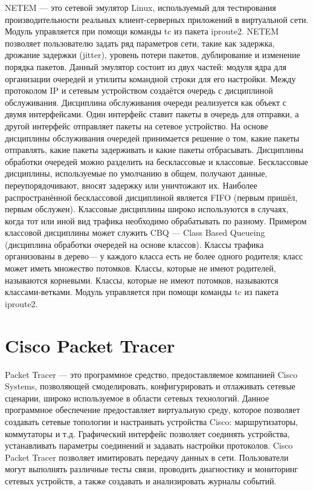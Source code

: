 NETEM —  это сетевой эмулятор Linux, используемый для тестирования производительности реальных клиент-серверных приложений в виртуальной сети. 
Модуль управляется при помощи команды tc из пакета iproute2. 
NETEM позволяет пользователю задать ряд параметров сети, такие как задержка, дрожание задержки (jitter), уровень потери пакетов, дублирование и изменение
порядка пакетов. Данный эмулятор состоит из двух частей: модуля ядра для организации очередей и утилиты командной строки для его настройки. Между
протоколом IP и сетевым устройством создаётся очередь с дисциплиной обслуживания. Дисциплина обслуживания очереди реализуется как объект с двумя
интерфейсами. Один интерфейс ставит пакеты в очередь для отправки, а другой
интерфейс отправляет пакеты на сетевое устройство. На основе дисциплины
обслуживания очередей принимается решение о том, какие пакеты отправлять,
какие пакеты задерживать и какие пакеты отбрасывать.
Дисциплины обработки очередей можно разделить на бесклассовые и классовые. Бесклассовые дисциплины, используемые по умолчанию в общем, получают данные, переупорядочивают,
вносят задержку или уничтожают их. Наиболее распространённой бесклассовой дисциплиной является FIFO
(первым пришёл, первым обслужен).
Классовые дисциплины широко используются в случаях, когда тот или иной
вид трафика необходимо обрабатывать по разному. Примером классовой дисциплины может служить CBQ — Class Based Queueing (дисциплина обработки
очередей на основе классов). Классы трафика организованы в дерево— у каждого
класса есть не более одного родителя; класс может иметь множество потомков.
Классы, которые не имеют родителей, называются корневыми. Классы, которые
не имеют потомков, называются классами-ветками.
Модуль управляется при помощи команды tc из пакета iproute2. 



\section{Cisco Packet Tracer}

Packet Tracer — это программное средство, предоставляемое компанией
Cisco Systems, позволяющей смоделировать, конфигурировать и отлаживать
сетевые сценарии, широко используемое в области сетевых
технологий. Данное программное обеспечение предоставляет виртуальную
среду, которое позволяет создавать сетевые топологии и настраивать
устройства Cisco: маршрутизаторы, коммутаторы и т.д. Графический
интерфейс позволяет соединять устройства, устанавливать параметры
соединений и задавать настройки протоколов. Cisco Packet Tracer
позволяет имитировать передачу данных в сети. Пользователи могут
выполнять различные тесты связи, проводить диагностику и мониторинг
сетевых устройств, а также создавать и анализировать журналы событий.

